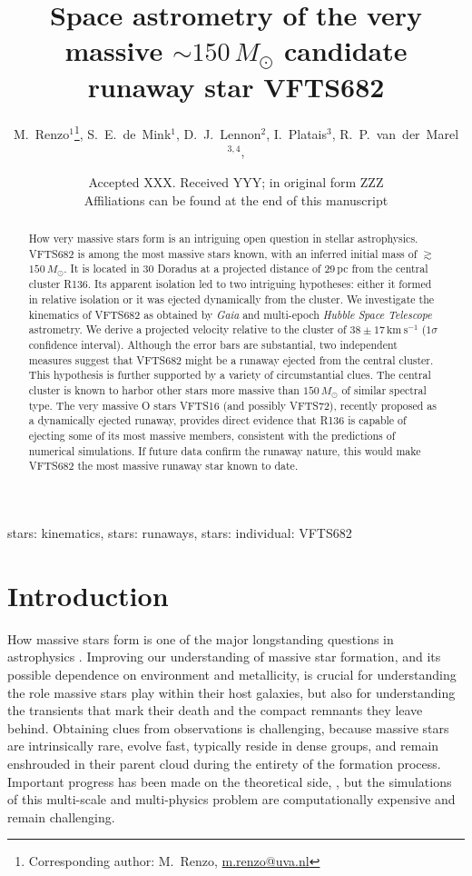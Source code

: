 \documentclass[a4paper,fleqn,usenatbib]{mnras}
\title[Space astrometry of the very massive $\sim$$150\,M_\odot$ candidate runaway star VFTS682]{Space astrometry of the very massive $\sim$$150\,M_\odot$  candidate runaway star VFTS682}
\author[Renzo et al.]{M.~Renzo$^{1}$\thanks{Corresponding author:
    M.~Renzo, \href{mailto:m.renzo@uva.nl}{m.renzo@uva.nl}}, S.~E.~de~Mink$^{1}$, D.~J.~Lennon$^{2}$, I.~Platais$^{3}$,
  R.~P.~van~der~Marel$^{3,4}$,
  \newauthor{E.~Laplace$^{1}$, J.~M.~Bestenlehner$^{5}$, C.~J.~Evans$^{6}$,
    V.~H\'enault-Brunet$^{7}$,  S.~Justham$^{1,8,9}$,
  }
\newauthor{A.~de~Koter$^{1}$,
      N.~Langer$^{10}$, F. Najarro$^{11}$, H.~Sana$^{12}$, F.~R.~N.~Schneider$^{13}$, J.~S.~Vink$^{14}$}}
\date{Accepted XXX. Received YYY; in original form ZZZ \\ Affiliations
can be found at the end of this manuscript}
\newcommand{\kms}{{\,\mathrm{km\ s^{-1}}}}
\begin{document}
\label{firsxtpage}
\pagerange{\pageref{firstpage}--\pageref{lastpage}}
\maketitle

\begin{abstract}
 
How very massive stars form is an intriguing open question in
stellar astrophysics.  VFTS682 is among the most massive stars known,
with an inferred initial mass of $\gtrsim$$150\,M_\odot$. It is located
in 30 Doradus at a projected distance of 29\,pc from the central
cluster R136. 
Its apparent isolation led to two intriguing hypotheses: 
either it formed in relative isolation 
or it was ejected dynamically from the cluster. 
We investigate the kinematics of
VFTS682 as obtained by \emph{Gaia} and multi-epoch \emph{Hubble Space Telescope} astrometry. We derive a projected velocity relative to
the cluster of $38\pm17\kms$ ($1\sigma$ confidence interval). Although
the error bars are substantial, two independent measures
suggest that VFTS682 might be a runaway
ejected from the central cluster. This hypothesis is further supported by a variety of
circumstantial clues. The central cluster is known to harbor 
other stars more massive than $150\,M_\odot$ of similar spectral
type. The very massive O stars VFTS16 (and possibly VFTS72), 
recently 
proposed as a dynamically ejected runaway, provides
direct evidence that R136 is
capable of ejecting some of its
most massive members, consistent with the predictions of numerical
simulations. If future data confirm the runaway nature, this would make VFTS682
the most massive runaway star known to date. 
\end{abstract}

\begin{keywords}
  stars: kinematics, stars: runaways, stars: individual: VFTS682
\end{keywords}

\section{Introduction}
\label{sec:intro}

How massive stars form is one of the major longstanding questions in astrophysics
\citep[e.g.,][]{zinnecker:07}. Improving our understanding of massive star formation, and its
possible dependence on environment and metallicity, is crucial for understanding the role massive stars play within their host galaxies, but also for understanding the transients that mark their death and the compact remnants they leave behind.
%
Obtaining clues from observations is challenging, because massive stars are intrinsically rare, 
evolve fast, typically reside in dense groups, and remain enshrouded in
their parent cloud during the entirety of the formation
process. Important progress has been made on the theoretical side,
\citep[e.g.][]{bate:09,kuiper:15,rosen:16}, but the simulations of this multi-scale and multi-physics problem are computationally expensive and remain challenging.  
\end{document}
